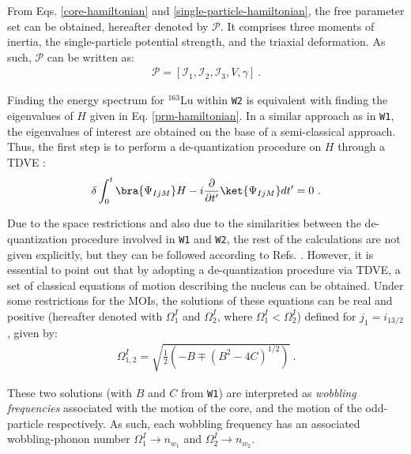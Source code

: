 \documentclass[myclassdoc,debug]{rjparticle}
\begin{document}
From Eqs. \ref{core-hamiltonian} and \ref{single-particle-hamiltonian}, the free parameter set can be obtained, hereafter denoted by $\mathcal{P}$. It comprises three moments of inertia, the single-particle potential strength, and the triaxial deformation. As such, $\mathcal{P}$ can be written as:
\begin{align}
    \mathcal{P}=\left[\mathcal{I}_1,\mathcal{I}_2,\mathcal{I}_3,V,\gamma\right]\ .
    \label{parameter-set}
\end{align}

Finding the energy spectrum for $^{163}$Lu within \texttt{W2} is equivalent with finding the eigenvalues of $H$ given in Eq. \ref{prm-hamiltonian}. In a similar approach as in \texttt{W1}, the eigenvalues of interest are obtained on the base of a semi-classical approach. Thus, the first step is to perform a de-quantization procedure on $H$ through a TDVE \cite{raduta2007semiclassical,budaca2018tilted,raduta2017semiclassical}:
\begin{align}
    \delta\int_0^t\bra{\Psi_{IjM}}H-i\frac{\partial}{\partial t'}\ket{\Psi_{IjM}}dt'=0\ .
    \label{tdve}
\end{align}

Due to the space restrictions and also due to the similarities between the de-quantization procedure involved in \texttt{W1} and \texttt{W2}, the rest of the calculations are not given explicitly, but they can be followed according to Refs. \cite{raduta2018wobbling,raduta2020approach,raduta2020towards}. However, it is essential to point out that by adopting a de-quantization procedure via TDVE, a set of classical equations of motion describing the nucleus can be obtained. Under some restrictions for the MOIs, the solutions of these equations can be real and positive (hereafter denoted with $\Omega_1^I$ and $\Omega_2^I$, where $\Omega_1^I<\Omega_2^I$) defined for $j_1=i_{13/2}$, given by:
\begin{align}
    \Omega_{1,2}^I=\sqrt{\frac{1}{2}\left(-B\mp(B^2-4C)^{1/2}\right)}\ .
    \label{wobbling-frequencies}
\end{align}

These two solutions (with $B$ and $C$ from \texttt{W1}) are interpreted as \emph{wobbling frequencies} associated with the motion of the core, and the motion of the odd-particle respectively. As such, each wobbling frequency has an associated wobbling-phonon number $\Omega_1^I \to n_{w_1}$ and $\Omega_2^I \to n_{w_2}$.
\end{document}
